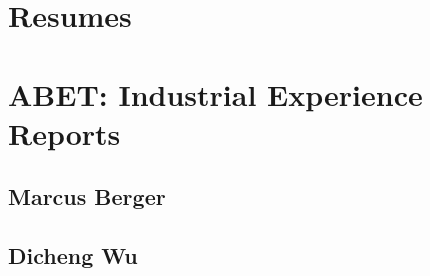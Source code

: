 

\section{Resumes}


%     
%     

\section{ABET: Industrial Experience Reports}

\subsection{Marcus Berger}

% 

\subsection{Dicheng Wu}

% 


